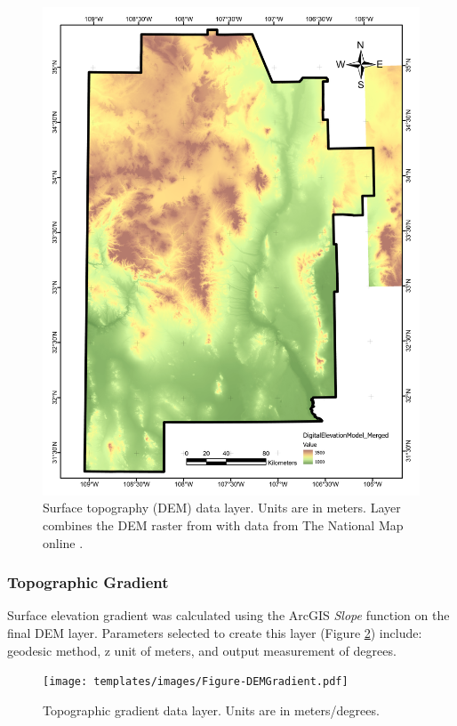 \begin{figure}[!htp]
\centering
\includegraphics[width=\textwidth]{templates/images/Figure-DEM.pdf}
\caption[Surface topography (DEM) data layer]{Surface topography (DEM) data layer. Units are in meters. Layer combines the DEM raster from \citep{bielicki_hydrogeolgic_2015} with data from The National Map online \citep{usgs_tnm_2021}.}
\label{fig:feat_dem}
\end{figure}

\subsubsection{Topographic Gradient}

Surface elevation gradient was calculated using the ArcGIS \textit{Slope} function on the final DEM layer. Parameters selected to create this layer (Figure \ref{fig:feat_dem_gradient}) include: geodesic method, z unit of meters, and output measurement of degrees.

\begin{figure}[!htp]
\centering
\texttt{[image: templates/images/Figure-DEMGradient.pdf]}
\caption[Topographic gradient data layer]{Topographic gradient data layer. Units are in meters/degrees.}
\label{fig:feat_dem_gradient}
\end{figure}

